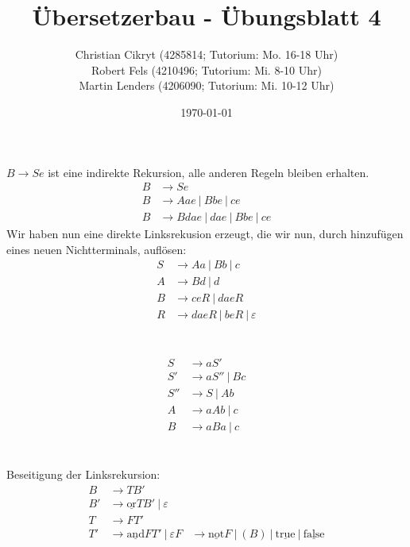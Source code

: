 \documentclass[a4paper,10pt]{scrartcl}
\title{Übersetzerbau - Übungsblatt 4}
\author{Christian Cikryt (4285814; Tutorium: Mo. 16-18 Uhr)\\
  Robert Fels (4210496; Tutorium: Mi. 8-10 Uhr)\\
  Martin Lenders (4206090; Tutorium: Mi. 10-12 Uhr)
  }
\date{\today}
\begin{document}
\maketitle

\section{}
$B \to Se$ ist eine indirekte Rekursion, alle anderen Regeln bleiben erhalten.
\begin{align*}
 B &\to Se \\
 B &\to Aae\ |\ Bbe\ |\ ce \\
 B &\to Bdae\ |\ dae\ |\ Bbe\ |\ ce
\end{align*}
Wir haben nun eine direkte Linksrekusion erzeugt, die wir nun, durch hinzufügen eines neuen Nichtterminals, auflösen:
\begin{align*}
 S &\to Aa\ |\ Bb\ |\ c \\
 A &\to Bd\ |\ d \\
 B &\to ceR\ |\ daeR \\
 R &\to daeR\ |\ beR\ |\ \varepsilon
\end{align*}

\section{}
\begin{align*}
 S &\to aS' \\
 S' &\to aS''\ |\ Bc \\
 S'' &\to S\ |\ Ab \\
 A &\to aAb\ |\ c \\
 B &\to aBa\ |\ c
\end{align*}

\section{}
Beseitigung der Linksrekursion:
\begin{align*}
 B &\to TB' \\
 B' &\to \underline{\textrm{or}} TB'\ |\ \varepsilon \\
 T &\to FT' \\
 T' &\to \underline{\textrm{and}} FT'\ |\ \varepsilon
 F &\to \underline{\textrm{not}} F\ |\ (B)\ |\ \underline{\textrm{true}}\ |\ \underline{\textrm{false}}
\end{align*}
\end{document}
